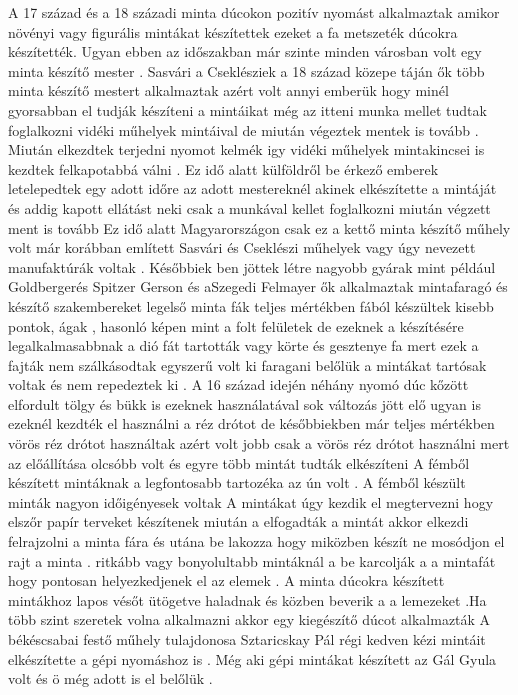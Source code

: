\documentclass[fontsize=12pt, appendixprefix=true]{scrreprt}
\begin{document}
A 17 század és a 18 századi minta dúcokon pozitív  nyomást alkalmaztak amikor növényi vagy figurális mintákat készítettek ezeket a fa metszeték  dúcokra készítették.
Ugyan ebben az időszakban már szinte minden városban volt egy minta készítő mester .
Sasvári a Cseklésziek  a 18 század közepe táján ők több minta készítő mestert alkalmaztak azért volt annyi emberük hogy minél gyorsabban el tudják készíteni a mintáikat 
még az itteni munka mellet tudtak foglalkozni vidéki műhelyek mintáival de miután végeztek mentek is tovább .
Miután elkezdtek terjedni nyomot kelmék igy vidéki műhelyek mintakincsei is kezdtek felkapotabbá  válni .
Ez idő alatt külföldről be érkező emberek letelepedtek egy adott időre az adott mestereknél akinek elkészítette a mintáját és addig kapott ellátást neki csak a munkával kellet foglalkozni miután végzett ment is tovább 
Ez idő alatt Magyarországon csak ez a kettő minta készítő műhely volt már korábban említett Sasvári és Cseklészi műhelyek vagy úgy nevezett manufaktúrák voltak .
Későbbiek ben jöttek létre nagyobb gyárak mint például Goldbergerés Spitzer Gerson és aSzegedi Felmayer ők alkalmaztak mintafaragó és készítő szakembereket 
legelső minta fák teljes mértékben fából készültek kisebb pontok, ágak , hasonló képen mint a folt felületek de ezeknek a készítésére legalkalmasabbnak a dió fát tartották vagy körte és gesztenye fa mert ezek a fajták nem szálkásodtak  egyszerű volt ki faragani belőlük a mintákat tartósak voltak és  nem repedeztek ki .
A 16  század idején néhány nyomó dúc kőzött elfordult tölgy és  bükk is ezeknek használatával sok változás jött elő
ugyan is ezeknél kezdték el használni a réz drótot de későbbiekben már teljes mértékben vörös réz drótot használtak
azért volt jobb csak a vörös réz drótot használni mert az előállítása olcsóbb volt és egyre több mintát tudták elkészíteni 
A fémből készített mintáknak a legfontosabb tartozéka az ún volt .
A fémből készült minták nagyon időigényesek voltak 
A mintákat úgy kezdik el megtervezni hogy elszőr papír terveket készítenek miután a elfogadták a mintát akkor elkezdi felrajzolni a minta fára és utána be lakozza hogy miközben készít ne mosódjon el rajt a minta .
ritkább vagy bonyolultabb mintáknál a be karcolják a a mintafát hogy pontosan helyezkedjenek el az elemek .
A minta dúcokra készített mintákhoz lapos vésőt ütögetve haladnak  és közben beverik a a lemezeket .Ha több szint szeretek volna alkalmazni akkor egy kiegészítő dúcot alkalmazták 
A békéscsabai festő műhely tulajdonosa Sztaricskay Pál  régi kedven kézi mintáit elkészítette a gépi nyomáshoz is .
Még aki gépi mintákat készített az Gál Gyula volt és ö még adott is el belőlük .
\end{document}
